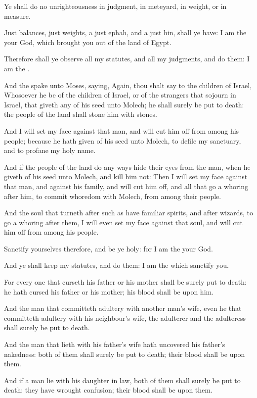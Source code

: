 \Verse Ye shall do no unrighteousness in judgment, in meteyard, in weight, or in measure.

\Verse Just balances, just weights, a just ephah, and a just hin, shall ye have: I am the \LORD your God, which brought you out of the land of Egypt.

\Verse Therefore shall ye observe all my statutes, and all my judgments, and do them: I am the \LORD.

\Chapter
\Verse And the \LORD spake unto Moses, saying, \Verse Again, thou shalt say to the children of Israel, Whosoever he be of the children of Israel, or of the strangers that sojourn in Israel, that giveth any of his seed unto Molech; he shall surely be put to death: the people of the land shall stone him with stones.

\Verse And I will set my face against that man, and will cut him off from among his people; because he hath given of his seed unto Molech, to defile my sanctuary, and to profane my holy name.

\Verse And if the people of the land do any ways hide their eyes from the man, when he giveth of his seed unto Molech, and kill him not: \Verse Then I will set my face against that man, and against his family, and will cut him off, and all that go a whoring after him, to commit whoredom with Molech, from among their people.

\Verse And the soul that turneth after such as have familiar spirits, and after wizards, to go a whoring after them, I will even set my face against that soul, and will cut him off from among his people.

\Verse Sanctify yourselves therefore, and be ye holy: for I am the \LORD your God.

\Verse And ye shall keep my statutes, and do them: I am the \LORD which sanctify you.

\Verse For every one that curseth his father or his mother shall be surely put to death: he hath cursed his father or his mother; his blood shall be upon him.

\Verse And the man that committeth adultery with another man's wife, even he that committeth adultery with his neighbour's wife, the adulterer and the adulteress shall surely be put to death.

\Verse And the man that lieth with his father's wife hath uncovered his father's nakedness: both of them shall surely be put to death; their blood shall be upon them.

\Verse And if a man lie with his daughter in law, both of them shall surely be put to death: they have wrought confusion; their blood shall be upon them.


